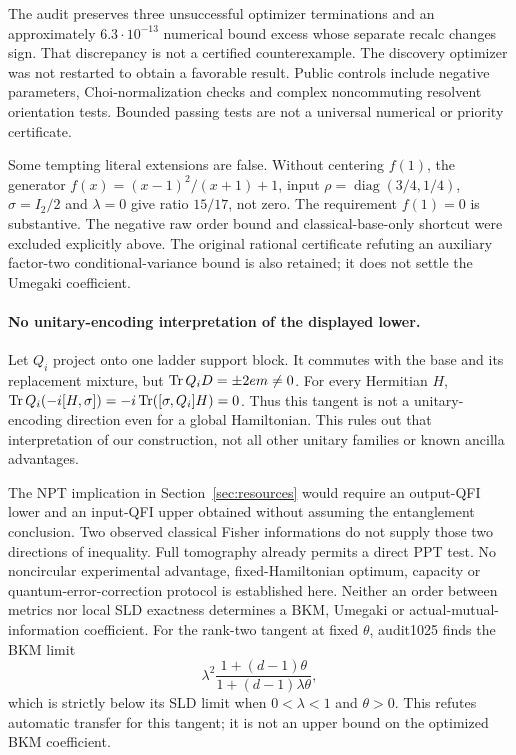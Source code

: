 The audit preserves three unsuccessful optimizer terminations and an approximately \(6.3\cdot10^{-13}\) numerical bound excess whose separate recalc changes sign. That discrepancy is not a certified counterexample. The discovery optimizer was not restarted to obtain a favorable result. Public controls include negative parameters, Choi-normalization checks and complex noncommuting resolvent orientation tests. Bounded passing tests are not a universal numerical or priority certificate.

Some tempting literal extensions are false. Without centering \(f(1)\), the generator \(f(x)=(x-1)^2/(x+1)+1\), input \(\rho=\operatorname{diag}(3/4,1/4)\), \(\sigma=I_2/2\) and \(\lambda=0\) give ratio \(15/17\), not zero. The requirement \(f(1)=0\) is substantive. The negative raw order bound and classical-base-only shortcut were excluded explicitly above. The original rational certificate refuting an auxiliary factor-two conditional-variance bound is also retained; it does not settle the Umegaki coefficient.

\paragraph{No unitary-encoding interpretation of the displayed lower.}
Let \(Q_i\) project onto one ladder support block. It commutes with the base and its replacement mixture, but \(\operatorname{Tr} Q_iD=\pm2em\ne0\). For every Hermitian \(H\),
\(\operatorname{Tr} Q_i(-i[H,\sigma])=-i\operatorname{Tr}([\sigma,Q_i]H)=0\).
Thus this tangent is not a unitary-encoding direction even for a global Hamiltonian. This rules out that interpretation of our construction, not all other unitary families or known ancilla advantages.

The NPT implication in Section~\ref{sec:resources} would require an output-QFI lower and an input-QFI upper obtained without assuming the entanglement conclusion. Two observed classical Fisher informations do not supply those two directions of inequality. Full tomography already permits a direct PPT test. No noncircular experimental advantage, fixed-Hamiltonian optimum, capacity or quantum-error-correction protocol is established here. Neither an order between metrics nor local SLD exactness determines a BKM, Umegaki or actual-mutual-information coefficient. For the rank-two tangent at fixed $\theta$, audit1025 finds the BKM limit
\[
 \lambda^2\frac{1+(d-1)\theta}{1+(d-1)\lambda\theta},
\]
which is strictly below its SLD limit when $0<\lambda<1$ and $\theta>0$. This refutes automatic transfer for this tangent; it is not an upper bound on the optimized BKM coefficient.

